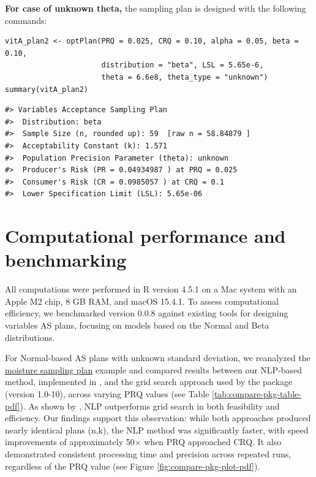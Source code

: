 \textbf{For case of unknown theta,} the sampling plan is designed with the following commands:

\begin{verbatim}
vitA_plan2 <- optPlan(PRQ = 0.025, CRQ = 0.10, alpha = 0.05, beta = 0.10, 
                      distribution = "beta", LSL = 5.65e-6,
                      theta = 6.6e8, theta_type = "unknown")
summary(vitA_plan2)
\end{verbatim}

\begin{verbatim}
#> Variables Acceptance Sampling Plan
#>  Distribution: beta 
#>  Sample Size (n, rounded up): 59  [raw n = 58.84879 ]
#>  Acceptability Constant (k): 1.571 
#>  Population Precision Parameter (theta): unknown 
#>  Producer's Risk (PR = 0.04934987 ) at PRQ = 0.025 
#>  Consumer's Risk (CR = 0.0985057 ) at CRQ = 0.1 
#>  Lower Specification Limit (LSL): 5.65e-06
\end{verbatim}

\section{Computational performance and benchmarking}\label{computational-performance-and-benchmarking}

All computations were performed in R version 4.5.1 \citep{R-base} on a Mac system
with an Apple M2 chip, 8 GB RAM, and macOS 15.4.1.
To assess computational efficiency, we benchmarked 
version 0.0.8 against existing tools for designing variables AS plans, focusing
on models based on the Normal and Beta distributions.

For Normal-based AS plans with unknown standard deviation, we reanalyzed the
\hyperref[subsec:moisture_exp]{moisture sampling plan} example and compared results between our NLP-based method, implemented in
, and the grid search approach used by the
 package (version 1.0-10), across varying PRQ values
(see Table \ref{tab:compare-pkg-table-pdf}).
As shown by \citet{duarte2013optimal}, NLP outperforms grid search in both feasibility
and efficiency. Our findings support this observation: while both approaches
produced nearly identical plans (n,k), the NLP method was significantly faster,
with speed improvements of approximately 50× when PRQ approached CRQ. It also
demonstrated consistent processing time and precision across repeated runs,
regardless of the PRQ value
(see Figure \ref{fig:compare-pkg-plot-pdf}).

